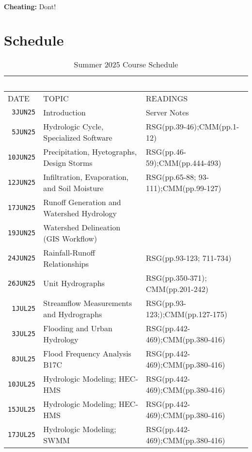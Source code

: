\documentclass[12pt]{article}
\begin{document}
\textbf{Cheating:} Dont!

\clearpage
\section*{Schedule}
\begin{table}[ht!]
   \centering
   \caption{Summer 2025 Course Schedule}
   \begin{tabular}{p{0.5in}p{3.0in}p{3.0in}} 
   ~ & ~ & ~  \\
\hline
DATE & TOPIC & READINGS  \\
\hline
\texttt{~3JUN25} & Introduction & Server Notes  \\ %
\texttt{~5JUN25} & Hydrologic Cycle, Specialized Software & RSG(pp.39-46);CMM(pp.1-12) \\ %
\texttt{10JUN25} & Precipitation, Hyetographs, Design Storms & RSG(pp.46-59);CMM(pp.444-493)\\ %
\texttt{12JUN25} & Infiltration, Evaporation, and Soil Moisture &  RSG(pp.65-88; 93-111);CMM(pp.99-127)\\ %
\texttt{17JUN25} & Runoff Generation and Watershed Hydrology \\ %
\texttt{19JUN25} & Watershed Delineation (GIS Workflow) & \\ %
\texttt{24JUN25} & Rainfall-Runoff Relationships & RSG(pp.93-123; 711-734)\\
\texttt{26JUN25} & Unit Hydrographs & RSG(pp.350-371); CMM(pp.201-242)\\
\texttt{~1JUL25} & Streamflow Measurements and Hydrographs & RSG(pp.93-123;);CMM(pp.127-175)\\
\texttt{~3JUL25} & Flooding and Urban Hydrology & RSG(pp.442-469);CMM(pp.380-416) \\ 
\texttt{~8JUL25} & Flood Frequency Analysis B17C & RSG(pp.442-469);CMM(pp.380-416)\\ %
\texttt{10JUL25} & Hydrologic Modeling; HEC-HMS & RSG(pp.442-469);CMM(pp.380-416) \\  %
\texttt{15JUL25} & Hydrologic Modeling; HEC-HMS & RSG(pp.442-469);CMM(pp.380-416)\\ %
\texttt{17JUL25} & Hydrologic Modeling; SWMM & RSG(pp.442-469);CMM(pp.380-416) \\ %

\end{tabular}
\end{table}
\end{document}
